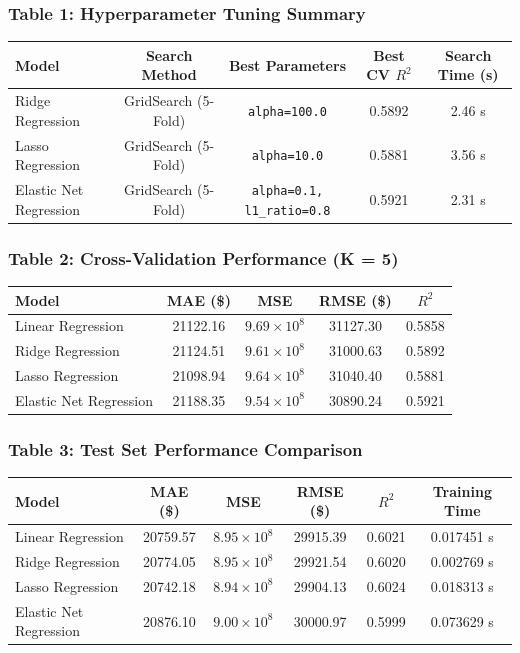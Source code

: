 \documentclass[12pt,a4paper]{article}
\begin{document}
\subsubsection*{Table 1: Hyperparameter Tuning Summary}
\begin{tabular}{lcccc}
\toprule
Model & Search Method & Best Parameters & Best CV $R^2$ & Search Time (s) \\
\midrule
Ridge Regression & GridSearch (5-Fold) & \texttt{alpha=100.0} & 0.5892 & 2.46 s \\
Lasso Regression & GridSearch (5-Fold) & \texttt{alpha=10.0} & 0.5881 & 3.56 s \\
Elastic Net Regression & GridSearch (5-Fold) & \texttt{alpha=0.1, l1\_ratio=0.8} & 0.5921 & 2.31 s \\
\bottomrule
\end{tabular}

\subsubsection*{Table 2: Cross-Validation Performance (K = 5)}
\begin{tabular}{lcccc}
\toprule
Model & MAE (\$) & MSE & RMSE (\$) & $R^2$ \\
\midrule
Linear Regression & 21122.16 & $9.69 \times 10^8$ & 31127.30 & 0.5858 \\
Ridge Regression & 21124.51 & $9.61 \times 10^8$ & 31000.63 & 0.5892 \\
Lasso Regression & 21098.94 & $9.64 \times 10^8$ & 31040.40 & 0.5881 \\
Elastic Net Regression & 21188.35 & $9.54 \times 10^8$ & 30890.24 & 0.5921 \\
\bottomrule
\end{tabular}

\subsubsection*{Table 3: Test Set Performance Comparison}
\begin{tabular}{lccccc}
\toprule
Model & MAE (\$) & MSE & RMSE (\$) & $R^2$ & Training Time \\
\midrule
Linear Regression & 20759.57 & $8.95 \times 10^8$ & 29915.39 & 0.6021 & 0.017451 s \\
Ridge Regression & 20774.05 & $8.95 \times 10^8$ & 29921.54 & 0.6020 & 0.002769 s \\
Lasso Regression & 20742.18 & $8.94 \times 10^8$ & 29904.13 & 0.6024 & 0.018313 s \\
Elastic Net Regression & 20876.10 & $9.00 \times 10^8$ & 30000.97 & 0.5999 & 0.073629 s \\
\bottomrule
\end{tabular}
\end{document}

